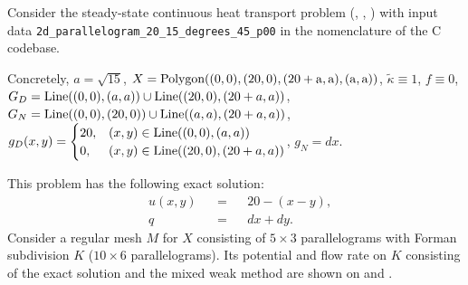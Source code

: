 \begin{example}
  \label{cmc/diffusion/continuous/steady_state/examples/2d_parallelogram_20_15_degrees_45_p00-example}
  Consider the steady-state continuous heat transport problem
  (,
   ,
   )
  with input data \verb|2d_parallelogram_20_15_degrees_45_p00| in the nomenclature of the C codebase.

  Concretely,
    $a = \sqrt{15}$,
    $X = {\rm Polygon((0, 0), (20, 0), (20 + a, a), (a, a))}$,
    $\tilde{\kappa} \equiv 1$,
    $f \equiv 0$,
    $G_D = {\rm Line}((0, 0), (a, a)) \cup {\rm Line}((20, 0), (20 + a, a))$,
    $G_N = {\rm Line}((0, 0), (20, 0)) \cup {\rm Line}((a, a), (20 + a, a))$,
    $g_D(x, y) =
      \begin{cases}
        20, & (x, y) \in {\rm Line}((0, 0), (a, a)) \\
        0,  & (x, y) \in {\rm Line}((20, 0), (20 + a, a))
      \end{cases}
    $,
    $g_N = d x$.

  This problem has the following exact solution:
  \begin{subequations}
    \begin{alignat}{3}
      & u(x, y) && = && 20 - (x - y), \\
      & q && = && d x + d y.
    \end{alignat}
  \end{subequations}
  Consider a regular mesh $M$ for $X$ consisting of $5 \times 3$ parallelograms
  with Forman subdivision $K$ ($10 \times 6$ parallelograms).
  Its potential and flow rate on $K$ consisting of the exact solution and the
  mixed weak method are shown on
  and
  .
\end{example}
